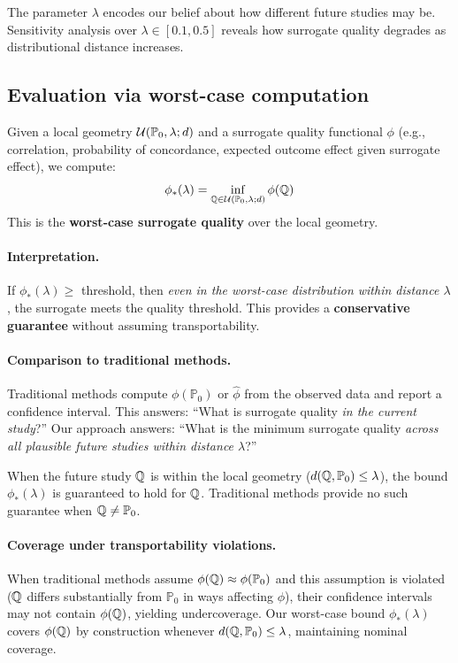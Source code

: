 \documentclass{article}
\newcommand{\PP}{\mathbb{P}}
\begin{document}
The parameter $\lambda$ encodes our belief about how different future studies may be. Sensitivity analysis over $\lambda \in [0.1, 0.5]$ reveals how surrogate quality degrades as distributional distance increases.

\subsection{Evaluation via worst-case computation}

Given a local geometry $\cU(\PP_0, \lambda; d)$ and a surrogate quality functional $\phi$ (e.g., correlation, probability of concordance, expected outcome effect given surrogate effect), we compute:
\begin{equation}\label{eq:worst-case}
    \phi_*(\lambda) = \inf_{\Q \in \cU(\PP_0, \lambda; d)} \phi(\Q)
\end{equation}
This is the \textbf{worst-case surrogate quality} over the local geometry.

\paragraph{Interpretation.}
If $\phi_*(\lambda) \geq$ threshold, then \emph{even in the worst-case distribution within distance $\lambda$}, the surrogate meets the quality threshold. This provides a \textbf{conservative guarantee} without assuming transportability.

\paragraph{Comparison to traditional methods.}
Traditional methods compute $\phi(\PP_0)$ or $\hat{\phi}$ from the observed data and report a confidence interval. This answers: ``What is surrogate quality \emph{in the current study}?'' Our approach answers: ``What is the minimum surrogate quality \emph{across all plausible future studies within distance $\lambda$}?''

When the future study $\mathbb{Q}$ is within the local geometry ($d(\Q, \PP_0) \leq \lambda$), the bound $\phi_*(\lambda)$ is guaranteed to hold for $\mathbb{Q}$. Traditional methods provide no such guarantee when $\Q \neq \PP_0$.

\paragraph{Coverage under transportability violations.}
When traditional methods assume $\phi(\Q) \approx \phi(\PP_0)$ and this assumption is violated ($\mathbb{Q}$ differs substantially from $\PP_0$ in ways affecting $\phi$), their confidence intervals may not contain $\phi(\mathbb{Q})$, yielding undercoverage. Our worst-case bound $\phi_*(\lambda)$ covers $\phi(\mathbb{Q})$ by construction whenever $d(\Q, \PP_0) \leq \lambda$, maintaining nominal coverage.
\end{document}
